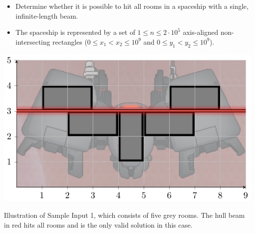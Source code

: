 \begin{frame}
    \frametitle{\problemtitle}

    \begin{itemize}
        \item Determine whether it is possible to hit all rooms in a spaceship with a single, infinite-length beam.
        \item The spaceship is represented by a set of $1 \leq n \leq 2 \cdot 10^5$
        axis-aligned non-intersecting rectangles (${0\leq x_1<x_2\leq10^9}$ and ${0\leq y_1<y_2\leq10^9}$).
    \end{itemize}

    \vfill

    \centering
    \includegraphics[height=0.4\textheight]{sample}

    \small
    Illustration of Sample Input 1, which consists of five grey rooms.
    The hull beam in red hits all rooms and is the only valid solution in this case.
\end{frame}
